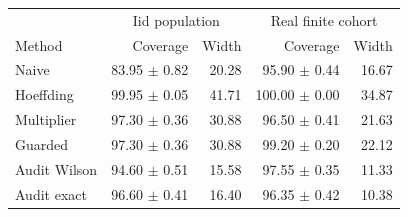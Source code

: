 \begin{tabular}{lrrrr}
\toprule
& \multicolumn{2}{c}{Iid population} & \multicolumn{2}{c}{Real finite cohort} \\
Method & Coverage & Width & Coverage & Width \\
\midrule
Naive & 83.95 $\pm$ 0.82 & 20.28 & 95.90 $\pm$ 0.44 & 16.67 \\
Hoeffding & 99.95 $\pm$ 0.05 & 41.71 & 100.00 $\pm$ 0.00 & 34.87 \\
Multiplier & 97.30 $\pm$ 0.36 & 30.88 & 96.50 $\pm$ 0.41 & 21.63 \\
Guarded & 97.30 $\pm$ 0.36 & 30.88 & 99.20 $\pm$ 0.20 & 22.12 \\
Audit Wilson & 94.60 $\pm$ 0.51 & 15.58 & 97.55 $\pm$ 0.35 & 11.33 \\
Audit exact & 96.60 $\pm$ 0.41 & 16.40 & 96.35 $\pm$ 0.42 & 10.38 \\
\bottomrule
\end{tabular}